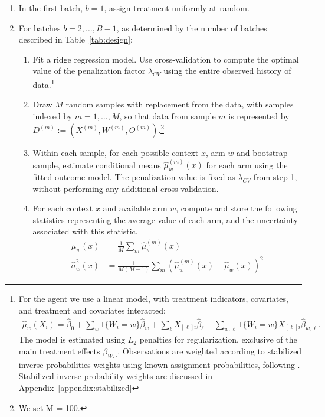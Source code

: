 \documentclass[letterpaper, 12pt, parskip=full,DIV=12]{scrartcl}
\begin{document}
\begin{enumerate}
\item In the first batch, $b = 1$, assign treatment uniformly at random. 


\item For batches $b = 2, \dots, B-1$, as determined by the number of batches described in Table~\ref{tab:design}:

\begin{enumerate}
	
 \item Fit a ridge regression model. Use cross-validation to compute the optimal value of the penalization factor $\lambda_{CV}$ using the entire observed history of data.\footnote{For the agent we use a linear model, with treatment indicators, covariates, and treatment and covariates interacted:
\begin{align*}
\hat{\mu}_w(X_{i}) = \hat{\beta}_{0} +
			\sum_{w} 1\{W_i = w\}\hat\beta_w  +
			\sum_{\ell}  X_{[\ell]i}\hat{\beta}_{\ell} +
         \sum_{w,\ell} 1\{ W_{i} = w\} X_{[\ell]i} \hat{\beta}_{w, \ell}.
         \label{eq:linear_model_full}
\end{align*} 
The model is estimated using $L_{2}$ penalties for regularization, exclusive of the main treatment effects $\beta_{W,\cdot}$. Observations are weighted according to stabilized inverse probabilities weights using known assignment probabilities, following \cite{dimakopoulou2017estimation}. Stabilized inverse probability weights are discussed in Appendix~\ref{appendix:stabilized}
}

  \item \label{step:draw} Draw $M$ random samples with replacement from the data, with samples indexed by $m = 1, \dots, M$, so that data from sample $m$ is represented by $D^{(m)} := (X^{(m)}, W^{(m)}, O^{(m)})$.\footnote{We set M = 100.} 

  \item Within each sample, for each possible context $x$, arm $w$ and bootstrap sample, estimate conditional means  $\hat{\mu}_w^{(m)}(x)$ for each arm using the fitted outcome model. The penalization value is fixed as $\lambda_{CV}$ from step 1, without performing any additional cross-validation.
  
  \item For each context $x$ and available arm $w$, compute and store the following statistics representing the average value of each arm, and the uncertainty associated with this statistic.
    \begin{equation*}
      \begin{aligned}
        \hat{\mu}_w(x)         &= \frac{1}{M}\sum_{m} \hat{\mu}_w^{(m)}(x) \\
         \hat{\sigma}^{2}_w(x) &= \frac{1}{M(M-1)} \sum_{m} (\hat{\mu}_w^{(m)}(x) - \hat{\mu}_w(x))^2
      \end{aligned}
    \end{equation*}


\end{enumerate}
\end{enumerate}
\end{document}

